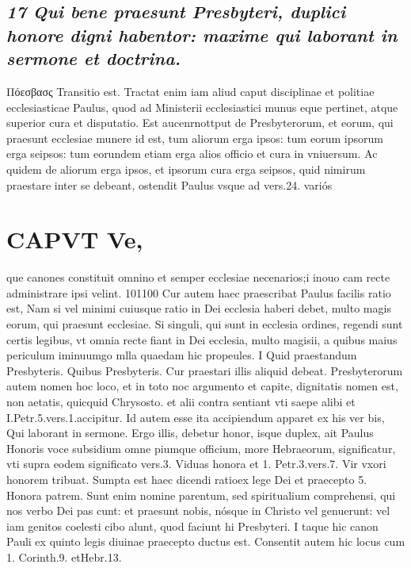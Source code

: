 \documentclass{article}
\begin{document}
\begin{pages}
\subsection*{\textit{17 Qui bene praesunt Presbyteri, duplici honore digni habentor: maxime qui laborant in sermone et doctrina. }}\pstart Πόεσβασς Transitio est. Tractat enim iam aliud caput disciplinae et politiae ecclesiasticae Paulus, quod ad Ministerii ecclesiastici munus eque pertinet, atque superior cura et disputatio. Est aucenrnottput de Presbyterorum, et eorum, qui praesunt ecclesiae munere id est, tum aliorum erga ipsos: tum eorum ipsorum erga seipsos: tum eorundem etiam erga alios officio et cura in vniuersum.  \pend\pstart Ac quidem de aliorum erga ipsos, et ipsorum cura erga seipsos, quid nimirum praestare inter se debeant, ostendit Paulus vsque ad vers.24. variós  \pend
\section*{CAPVT Ve, }\pstart que canones constituit omnino et semper ecclesiae necenarios;i inouo cam recte administrare ipsi velint. 101100  \pend\pstart Cur autem haec praescribat Paulus facilis ratio est, Nam si vel minimi cuiusque ratio in Dei ecclesia haberi debet, multo magis eorum, qui praesunt ecclesiae. Si singuli, qui sunt in ecclesia ordines, regendi sunt certis legibus, vt omnia recte fiant in Dei ecclesia, multo magisii, a quibus maius periculum iminuumgo mlla quaedam hic propeules.  \pend\pstart I Quid praestandum Presbyteris.  \pend{} Quibus Presbyteris.  \pend{} Cur praestari illis aliquid debeat.  \pend\pstart Presbyterorum autem nomen hoc loco, et in toto noc argumento et capite, dignitatis nomen est, non aetatis, quicquid Chrysosto. et alii contra sentiant vti saepe alibi et I.Petr.5.vers.1.accipitur. Id autem esse ita accipiendum apparet ex his ver bis, Qui laborant in sermone.  \pend\pstart Ergo illis, debetur honor, isque duplex, ait Paulus Honoris voce subsidium omne piumque officium, more Hebraeorum, significatur, vti supra eodem significato vers.3. Viduas honora et 1. Petr.3.vers.7. Vir vxori honorem tribuat. Sumpta est haec dicendi ratioex lege Dei et praecepto 5. Honora patrem. Sunt enim nomine parentum, sed spiritualium comprehensi, qui nos verbo Dei pas cunt: et praesunt nobis, nósque in Christo vel genuerunt: vel iam genitos coelesti cibo alunt, quod faciunt hi Presbyteri. I taque hic canon Pauli ex quinto legis diuinae praecepto ductus est. Consentit autem hic locus cum 1. Corinth.9. etHebr.13.  \pend

\end{pages}
\end{document}
